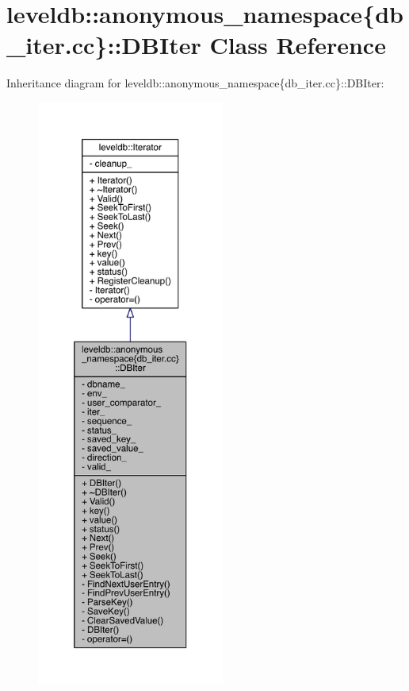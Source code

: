 \hypertarget{classleveldb_1_1anonymous__namespace_02db__iter_8cc_03_1_1_d_b_iter}{}\section{leveldb\+:\+:anonymous\+\_\+namespace\{db\+\_\+iter.\+cc\}\+:\+:D\+B\+Iter Class Reference}
\label{classleveldb_1_1anonymous__namespace_02db__iter_8cc_03_1_1_d_b_iter}


Inheritance diagram for leveldb\+:\+:anonymous\+\_\+namespace\{db\+\_\+iter.\+cc\}\+:\+:D\+B\+Iter\+:
\nopagebreak
\begin{figure}[H]
\begin{center}
\leavevmode
\includegraphics[height=550pt]{classleveldb_1_1anonymous__namespace_02db__iter_8cc_03_1_1_d_b_iter__inherit__graph}
\end{center}
\end{figure}


